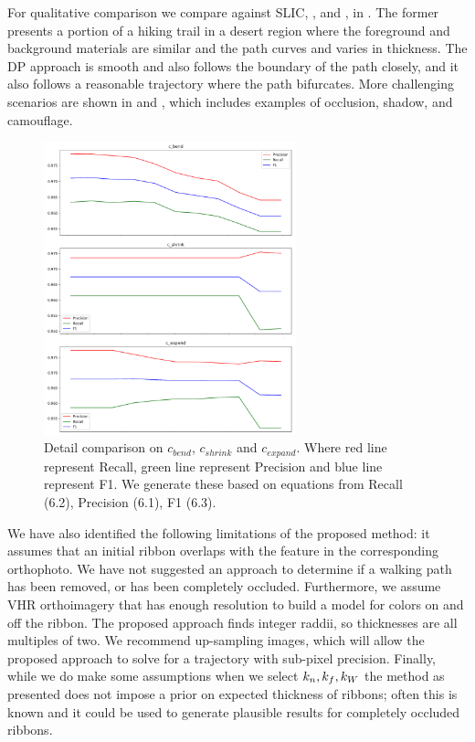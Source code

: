 For qualitative comparison we compare against \ac{SLIC}, \ActiveContours{}, and \GrabCut{}, in
. The former presents a portion of a hiking trail in a desert region where the foreground and background materials are similar and the path curves and varies in thickness. The \ac{DP} approach is smooth and also follows the boundary of the path closely, and it also follows a reasonable trajectory where the path bifurcates. More challenging scenarios are shown in  and , which includes examples of occlusion, shadow, and camouflage.  

\begin{figure}[H]
    \centering
    \includegraphics[width=0.65\textwidth]{Figures/prf.png}
    \caption[Parameters Evaluation]{Detail comparison on $c_{bend}$, $c_{shrink}$ and $c_{expand}$. Where red line represent Recall, green line represent Precision and blue line represent F1. We generate these based on equations from Recall (6.2), Precision (6.1), F1 (6.3).}
    \label{fig:change_on_recall}
\end{figure}

We have also identified the following limitations of the proposed method: it assumes that an initial ribbon overlaps with the feature in the corresponding orthophoto. 
We have not suggested an approach to determine if a walking path has been removed, or has been completely occluded. Furthermore, we assume \ac{VHR} orthoimagery that has enough resolution to build a model for colors on and off the ribbon. 
The proposed approach finds integer raddii, so thicknesses are all multiples of two. 
We recommend up-sampling images, which will allow the proposed approach to solve for a trajectory with sub-pixel precision. 
Finally, while we do make some assumptions when we select $k_n{}, k_f{}, k_W{}$ the method as presented does not impose a prior on expected thickness of ribbons; often this is known and it could be used to generate plausible results for completely occluded ribbons.

